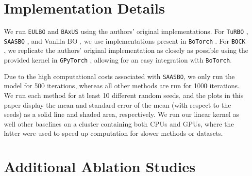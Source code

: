 \documentclass[twoside]{article}
\theoremstyle{plain}
\theoremstyle{definition}
\begin{document}
\section{Implementation Details} \label{app:implementation-details}
We run \texttt{EULBO} \citep{maus2024approximation} and \texttt{BAxUS} \citep{papenmeier2022increasing} using the authors' original implementations. For \texttt{TuRBO} \citep{eriksson2019scalable}, \texttt{SAASBO} \citep{eriksson2021high}, and Vanilla BO \citep{hvarfner2024vanilla}, we use implementations present in \texttt{BoTorch} \citep{balandat2020botorch}. For \texttt{BOCK} \citep{oh2018bock}, we replicate the authors' original implementation as closely as possible using the provided kernel in \texttt{GPyTorch} \citep{gardner2018gpytorch}, allowing for an easy integration with \texttt{BoTorch}.

Due to the high computational costs associated with \texttt{SAASBO}, we only run the model for 500 iterations, whereas all other methods are run for 1000 iterations. We run each method for at least 10 different random seeds, and the plots in this paper display the mean and standard error of the mean (with respect to the seeds) as a solid line and shaded area, respectively. We run our linear kernel as well other baselines on a cluster containing both CPUs and GPUs,\textit{} where the latter were used to speed up computation for slower methods or datasets.

\section{Additional Ablation Studies}
\end{document}
